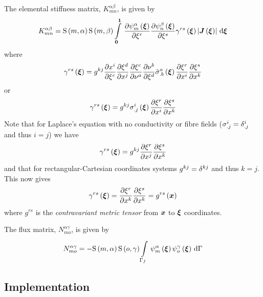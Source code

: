 The elemental stiffness matrix, $K^{\alpha\beta}_{mn}$, is given by
\begin{equation}
  K^{\alpha\beta}_{mn}=\gsf{m}{\alpha}\gsf{m}{\beta}
  \gint{\vectr{0}}{\vectr{1}}{\delby{\gbfn{m}{\alpha}{\vectr{\xi}}}{\xi^{r}}
    \delby{\gbfn{n}{\beta}{\vectr{\xi}}}{\xi^{s}}\fnof{\gamma^{rs}}{\vectr{\xi}}
    \abs{\fnof{\matr{J}}{\vectr{\xi}}}}{\vectr{\xi}}
  \label{eqn:elementalfemlhs2}
\end{equation}
where
\begin{equation}
  \fnof{\gamma^{rs}}{\vectr{\xi}}=\generalmetrictensorsymbol^{kj}\delby{x^{i}}{\xi^{c}}
  \delby{\xi^{d}}{x^{j}}\delby{\xi^{c}}{\nu^{a}}\delby{\nu^{b}}{\xi^{d}}
  \fnof{{\tilde{\conductivitytensorsymbol}}^{a}_{.b}}{\vectr{\xi}}
  \delby{\xi^{r}}{x^{i}}\delby{\xi^{s}}{x^{k}}
  \label{eqn:diffusiongammadefinition1}
\end{equation}
or
\begin{equation}
   \gamma^{rs}\left(  \boldsymbol{\xi}  \right) = g ^{kj}
    \sigma ^{i}_{.j}\left(  \boldsymbol{\xi}  \right)  \dfrac{\partial \xi^{r}}{\partial x^{i}}  \dfrac{\partial \xi^{s}}{\partial x^{k}} 
\end{equation}
Note that for Laplace's equation with no conductivity or fibre fields
(\ie $ \sigma ^{i}_{.j}=  \delta ^{i}_{.j} $ and thus $i=j$) we
  have
\begin{equation}
  \fnof{\gamma^{rs}}{\vectr{\xi}}=\generalmetrictensorsymbol^{kj}\delby{\xi^{r}}{x^{j}}\delby{\xi^{s}}{x^{k}}
  \label{eqn:diffusiongammadefinition2}
\end{equation}
and that for rectangular-Cartesian coordinates systems
$ g ^{kj}=   \delta ^{{k}{j}}  $ and thus $k=j$. This now gives
\begin{equation}
  \fnof{\gamma^{rs}}{\vectr{\xi}}=\delby{\xi^{r}}{x^{k}}\delby{\xi^{s}}{x^{k}}=\fnof{g^{rs}}{\vectr{x}}
  \label{eqn:diffusiongammadefinition3}
\end{equation}
where $g^{rs}$ is the \emph{contravariant metric tensor} from $ \boldsymbol{x} $ to
$ \boldsymbol{\xi} $ coordinates.

The flux matrix, $N^{\alpha\gamma}_{mo}$, is given by
\begin{equation}
  N^{\alpha\gamma}_{mo} = -\gsf{m}{\alpha}\gsf{o}{\gamma}
  \gint{\Gamma_{f}}{}{\gbfn{m}{\alpha}{\vectr{\xi}}\gbfn{o}{\gamma}{\vectr{\xi}}}{\Gamma}
\end{equation}

\subsection{\OpenCMISS Implementation}

